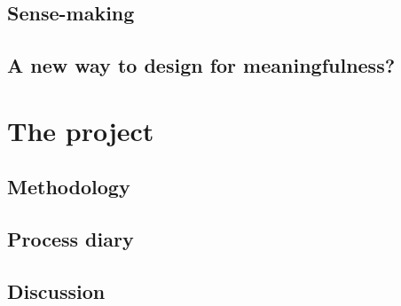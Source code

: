 \documentclass[UKenglish]{ifimaster}
\begin{document}
\chapter{Sense-making}

\chapter{A new way to design for meaningfulness?}


\part{The project}
\chapter{Methodology}

\chapter{Process diary}


\chapter{Discussion}


\backmatter{}
\printbibliography

%
\end{document}
